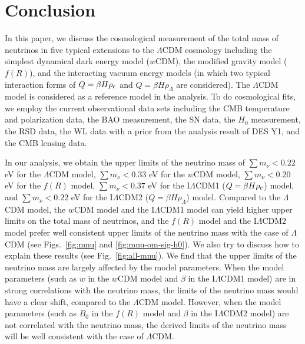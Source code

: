 \documentclass[aps,prd,nofootinbib,amsmath,amssymb,twocolumn,superscriptaddress,10pt]{revtex4}%
\newcommand{\update}[1]{\textcolor{purple}{#1}}
\begin{document}
\section{Conclusion}\label{sec:discussion}

In this paper, we discuss the cosmological measurement of the total mass of neutrinos in five typical extensions to the $\Lambda$CDM cosmology including the simplest dynamical dark energy model ($w$CDM), the modified gravity model ($f(R)$), and the interacting vacuum energy models (in which two typical interaction forms of $Q=\beta H\rho_{\rm c}$ and $Q=\beta H\rho_{\Lambda}$ are considered). The $\Lambda$CDM model is considered as a reference model in the analysis. To do cosmological fits, we employ the current observational data sets including the CMB temperature and polarization data, the BAO measurement, the SN data, the $H_{0}$ measurement, the RSD data, the WL data with a prior from the analysis result of DES Y1, and the CMB lensing data.

In our analysis, we obtain the upper limits of the neutrino mass of $\sum m_{\nu}<0.22$ eV for the $\Lambda$CDM model, $\sum m_{\nu}<0.33$ eV for the $w$CDM model, $\sum m_{\nu}<0.20$ eV for the $f(R)$ model, $\sum m_{\nu}<0.37$ eV for the I$\Lambda$CDM1 ($Q=\beta H\rho_{\rm c}$) model, and $\sum m_{\nu}<0.22$ eV for the I$\Lambda$CDM2 ($Q=\beta H\rho_{\Lambda}$) model. Compared to the $\Lambda$CDM model, the $w$CDM model and the I$\Lambda$CDM1 model can yield higher upper limits on the total mass of neutrinos, and the $f(R)$ model and the I$\Lambda$CDM2 model prefer well consistent upper limits of the neutrino mass with the case of $\Lambda$CDM (see Figs.~\ref{fig:mnu} and \ref{fig:mnu-om-sig-h0}).
We also try to discuss how to explain these results (see Fig.~\ref{fig:all-mnu}). We find that the upper limits of the neutrino mass are largely affected by the model parameters. When the model parameters  {(such as $w$ in the $w$CDM model and $\beta$ in the I$\Lambda$CDM1 model)} are in strong correlations with the neutrino mass, the limits of the neutrino mass would have a clear shift, compared to the $\Lambda$CDM model. However, when the model parameters {(such as $B_{0}$ in the $f(R)$ model and $\beta$ in the I$\Lambda$CDM2 model)}  are not correlated with the neutrino mass, the derived limits of the neutrino mass will be well consistent with the case of $\Lambda$CDM.
\end{document}
